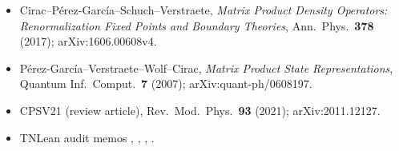 \documentclass{article}
\theoremstyle{plain}
\begin{document}
\begin{itemize}
    \item Cirac--P\'erez-Garc\'ia--Schuch--Verstraete, \textit{Matrix
              Product Density Operators: Renormalization Fixed Points and
              Boundary Theories}, Ann.~Phys.~\textbf{378} (2017);
          arXiv:1606.00608v4.
    \item P\'erez-Garc\'ia--Verstraete--Wolf--Cirac, \textit{Matrix
              Product State Representations}, Quantum Inf.~Comput.~\textbf{7}
          (2007); arXiv:quant-ph/0608197.
    \item CPSV21 (review article), Rev.~Mod.~Phys.~\textbf{93} (2021);
          arXiv:2011.12127.
    \item TNLean audit memos
          ,
          ,
          ,
          .
\end{itemize}
\end{document}
